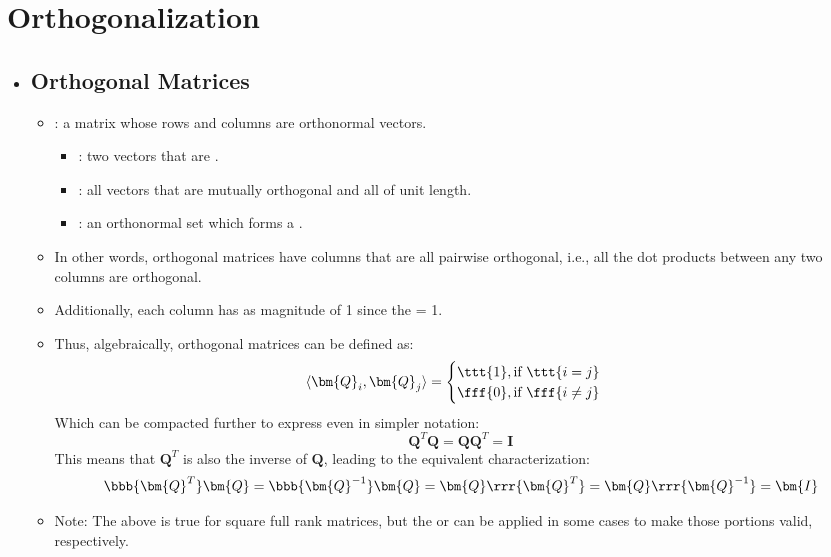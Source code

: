\section{Orthogonalization}\label{Orthogonalization}
\begin{itemize}
  \item []
  
  \subsection{Orthogonal Matrices}\label{Orthogonal Matrices}
  \begin{itemize}
    \item {}: a matrix whose rows and columns are orthonormal vectors.
      \begin{itemize}
        \item {}: two vectors that are \hyperref[Geometric Interpretation of the Dot Product]{} \hyperref[Unit Vectors]{}.
        \item {}: all vectors that are mutually orthogonal and all of unit length.
        \item {}: an orthonormal set which forms a \hyperref[Basis]{}.
      \end{itemize}
    \item In other words, orthogonal matrices have columns that are all pairwise orthogonal, i.e., all the dot products between any two columns are orthogonal.
    \item Additionally, each column has as magnitude of 1 since the \hyperref[Vector Length]{} = 1.
    \item Thus, algebraically, orthogonal matrices can be defined as:
    \[%
    \langle \bm{Q}_i, \bm{Q}_j \rangle = 
    \begin{cases}
    \ttt{1}, \text{if}~\ttt{i=j} \\
    \fff{0}, \text{if}~\fff{i\neq j}
    \end{cases}
    \]%
    Which can be compacted further to express even in simpler notation:
    \[%
    \bm{Q}^T \bm{Q} = \bm{Q}\bm{Q}^T = \bm{I}
    \]%
    This means that \(\bm{Q}^T\) is also the inverse of \(\bm{Q}\), leading to the equivalent characterization: 
    \[%
    \bbb{\bm{Q}^T} \bm{Q} = \bbb{\bm{Q}^{-1}}\bm{Q} = \bm{Q}\rrr{\bm{Q}^T} = \bm{Q}\rrr{\bm{Q}^{-1}}  = \bm{I} 
    \]%
    \item Note: The above is true for square full rank matrices, but the  or  \hyperref[Inverse Basics]{} can be applied in some cases to make those portions valid, respectively.
  \end{itemize}


\end{itemize}
